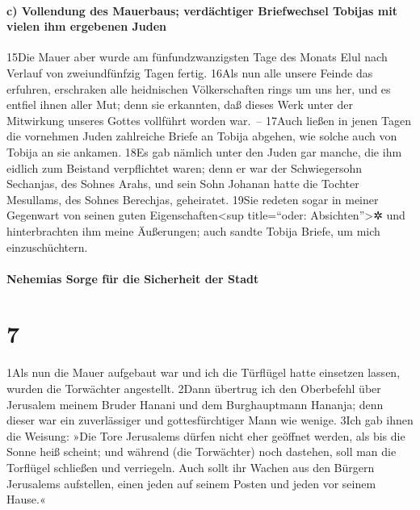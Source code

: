 \hypertarget{c-vollendung-des-mauerbaus-verduxe4chtiger-briefwechsel-tobijas-mit-vielen-ihm-ergebenen-juden}{%
\paragraph{c) Vollendung des Mauerbaus; verdächtiger Briefwechsel
Tobijas mit vielen ihm ergebenen
Juden}\label{c-vollendung-des-mauerbaus-verduxe4chtiger-briefwechsel-tobijas-mit-vielen-ihm-ergebenen-juden}}

15Die Mauer aber wurde am fünfundzwanzigsten Tage des Monats Elul nach
Verlauf von zweiundfünfzig Tagen fertig. 16Als nun alle unsere Feinde
das erfuhren, erschraken alle heidnischen Völkerschaften rings um uns
her, und es entfiel ihnen aller Mut; denn sie erkannten, daß dieses Werk
unter der Mitwirkung unseres Gottes vollführt worden war.~-- 17Auch
ließen in jenen Tagen die vornehmen Juden zahlreiche Briefe an Tobija
abgehen, wie solche auch von Tobija an sie ankamen. 18Es gab nämlich
unter den Juden gar manche, die ihm eidlich zum Beistand verpflichtet
waren; denn er war der Schwiegersohn Sechanjas, des Sohnes Arahs, und
sein Sohn Johanan hatte die Tochter Mesullams, des Sohnes Berechjas,
geheiratet. 19Sie redeten sogar in meiner Gegenwart von seinen guten
Eigenschaften\textless sup title=``oder: Absichten''\textgreater✲ und
hinterbrachten ihm meine Äußerungen; auch sandte Tobija Briefe, um mich
einzuschüchtern.

\hypertarget{nehemias-sorge-fuxfcr-die-sicherheit-der-stadt}{%
\paragraph{Nehemias Sorge für die Sicherheit der
Stadt}\label{nehemias-sorge-fuxfcr-die-sicherheit-der-stadt}}

\hypertarget{section-6}{%
\section{7}\label{section-6}}

1Als nun die Mauer aufgebaut war und ich die Türflügel hatte einsetzen
lassen, wurden die Torwächter angestellt. 2Dann übertrug ich den
Oberbefehl über Jerusalem meinem Bruder Hanani und dem Burghauptmann
Hananja; denn dieser war ein zuverlässiger und gottesfürchtiger Mann wie
wenige. 3Ich gab ihnen die Weisung: »Die Tore Jerusalems dürfen nicht
eher geöffnet werden, als bis die Sonne heiß scheint; und während (die
Torwächter) noch dastehen, soll man die Torflügel schließen und
verriegeln. Auch sollt ihr Wachen aus den Bürgern Jerusalems aufstellen,
einen jeden auf seinem Posten und jeden vor seinem Hause.«

